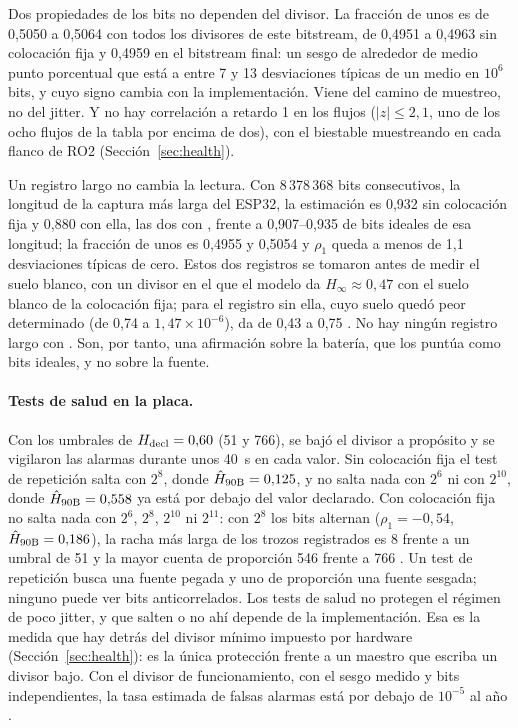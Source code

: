 Dos propiedades de los bits no dependen del divisor. La fracción de unos
es de 0,5050 a 0,5064 con todos los divisores de este bitstream, de
0,4951 a 0,4963 sin colocación fija y 0,4959 en el bitstream final: un
sesgo de alrededor de medio punto porcentual que está a entre 7 y 13
desviaciones típicas de un medio en $10^6$ bits, y cuyo signo cambia con
la implementación. Viene del camino de muestreo, no del jitter. Y no hay
correlación a retardo 1 en los flujos ($|z| \le 2{,}1$, uno de los ocho
flujos de la tabla por encima de dos), con el biestable muestreando en
cada flanco de RO2 (Sección~\ref{sec:health}).

Un registro largo no cambia la lectura. Con 8\,378\,368 bits
consecutivos, la longitud de la captura más larga del ESP32, la
estimación es 0,932 sin colocación fija y 0,880 con ella, las dos con
, frente a 0,907--0,935 de bits ideales de esa longitud; la
fracción de unos es 0,4955 y 0,5054 y $\rho_1$ queda a menos de 1,1
desviaciones típicas de cero. Estos dos registros se tomaron antes de
medir el suelo blanco, con un divisor en el que el modelo da
$H_\infty \approx 0{,}47$ con el suelo blanco de la colocación fija; para
el registro sin ella, cuyo suelo quedó peor determinado (de 0,74 a
$1{,}47\times10^{-6}$), da de 0,43 a 0,75 \est{}. No hay ningún registro
largo con . Son,
por tanto, una afirmación sobre la batería, que los puntúa como bits
ideales, y no sobre la fuente.

\paragraph{Tests de salud en la placa.} Con los umbrales de
$H_{\mathrm{decl}} = 0{,}60$ (51 y 766), se bajó el divisor a propósito y se
vigilaron las alarmas durante unos 40~s en cada valor. Sin colocación
fija el test de repetición salta con $2^{8}$, donde $\hat{H}_{\mathrm{90B}} = 0{,}125$, y
no salta nada con $2^{6}$ ni con $2^{10}$, donde $\hat{H}_{\mathrm{90B}} = 0{,}558$ ya está
por debajo del valor declarado. Con colocación fija no salta nada con
$2^{6}$, $2^{8}$, $2^{10}$ ni $2^{11}$: con $2^{8}$ los bits alternan
($\rho_1 = -0{,}54$, $\hat{H}_{\mathrm{90B}} = 0{,}186$), la racha más larga de los trozos
registrados es 8 frente a un umbral de 51 y la mayor cuenta de proporción
546 frente a 766 \meas{}. Un test de repetición busca una fuente pegada y
uno de proporción una fuente sesgada; ninguno puede ver bits
anticorrelados. Los tests de salud no protegen el régimen de poco jitter,
y que salten o no ahí depende de la implementación. Esa es la medida que
hay detrás del divisor mínimo impuesto por hardware
(Sección~\ref{sec:health}): es la única protección frente a un maestro
que escriba un divisor bajo. Con el divisor de funcionamiento, con el
sesgo medido y bits independientes, la tasa estimada de falsas alarmas
está por debajo de $10^{-5}$ al año \est{}.

